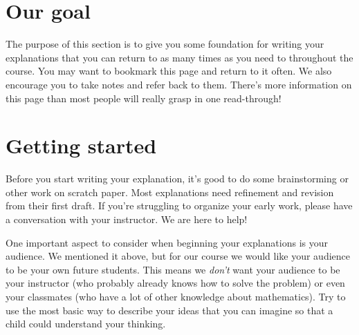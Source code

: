 \documentclass[noauthor,nooutcomes]{ximera}
\begin{document}
\section{Our goal}
The purpose of this section is to give you some foundation for writing your explanations that you can return to as many times as you need to throughout the course. You may want to bookmark this page and return to it often. We also encourage you to take notes and refer back to them. There's more information on this page than most people will really grasp in one read-through!

\section{Getting started}
Before you start writing your explanation, it's good to do some brainstorming or other work on scratch paper. Most explanations need refinement and revision from their first draft. If you're struggling to organize your early work, please have a conversation with your instructor. We are here to help!

One important aspect to consider when beginning your explanations is your audience. We mentioned it above, but for our course we would like your audience to be your own future students. This means we {\em don't} want your audience to be your instructor (who probably already knows how to solve the problem) or even your classmates (who have a lot of other knowledge about mathematics). Try to use the most basic way to describe your ideas that you can imagine so that a child could understand your thinking.
\end{document}
